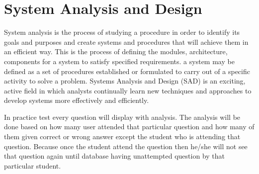 \section{System Analysis and Design}
System analysis is the process of studying a procedure in order to identify its goals and purposes and create systems and procedures that will achieve them in an efficient way. This is the process of defining the modules, architecture, components for a system to satisfy specified requirements. a system may be defined as a set of procedures established or formulated to carry out of a specific activity to solve a problem. Systems Analysis and Design (SAD) is an exciting, active field in which analysts continually learn new techniques and approaches to develop systems more effectively and efficiently.

In practice test every question will display with analysis. The analysis will be done based on how many user attended that particular question and how many of them given correct or wrong answer except the student who is attending that question. Because once the student attend the question then he/she will not see that question again until database having unattempted question by that particular student.
